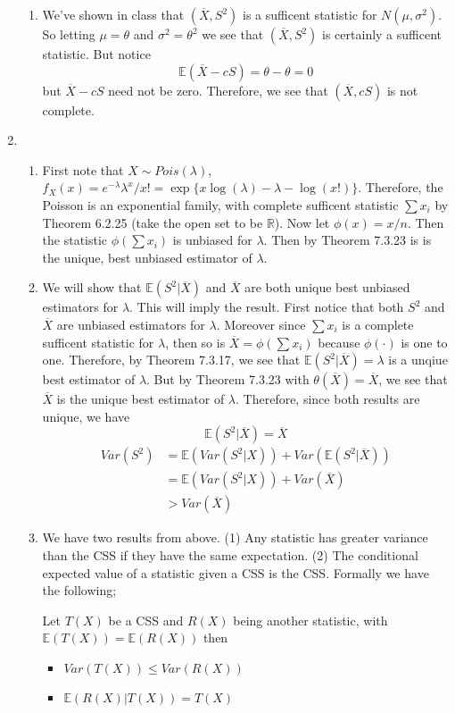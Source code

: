 \documentclass[12pt]{article}  %
\newcommand{\R}{{\mathbb{R}}}
\newcommand{\E}{{\mathbb{E}}}
\begin{document}
\begin{enumerate}
\begin{enumerate}
\item We've shown in class that $(\overline{X}, S^2)$ is a sufficent statistic for $N(\mu, \sigma^2)$. So letting $\mu = \theta$ and $\sigma^2 = \theta^2$ we see that $(\overline{X}, S^2)$ is certainly a sufficent statistic. But notice $$\E(\overline{X} - cS) = \theta - \theta = 0$$ but $\overline{X}-cS$ need not be zero. Therefore, we see that $(\overline{X}, cS)$ is not complete.
\end{enumerate}

\item 
\begin{enumerate}
\item First note that $X\sim Pois(\lambda)$, $f_X(x) = e^{-\lambda}\lambda^x/x! = \exp\{x\log(\lambda) - \lambda - \log(x!)\}$. Therefore, the Poisson is an exponential family, with complete sufficent statistic $\sum x_i$ by Theorem 6.2.25 (take the open set to be $\R$). Now let $\phi(x) = x/n$. Then the statistic $\phi(\sum x_i)$ is unbiased for $\lambda$. Then by Theorem 7.3.23 is is the unique, best unbiased estimator of $\lambda$.  

\item We will show that $\E(S^2|\overline{X})$ and $\overline{X}$ are both unique best unbiased estimators for $\lambda$. This will imply the result. First notice that both $S^2$ and $\overline{X}$ are unbiased estimators for $\lambda$. Moreover since $\sum x_i$ is a complete sufficent statistic for $\lambda$, then so is $\overline{X} = \phi(\sum x_i)$ because $\phi(\cdot)$ is one to one. Therefore, by Theorem 7.3.17, we see that $\E(S^2|\overline{X}) = \lambda$ is a unqiue best estimator of $\lambda$. But by Theorem 7.3.23 with $\theta(\overline{X}) = \overline{X}$, we see that $\overline{X}$ is the unique best estimator of $\lambda$. Therefore, since both results are unique, we have $$\E(S^2|\overline{X}) = \overline{X}$$
\begin{align*}
Var(S^2) &= \E(Var(S^2|X)) + Var(\E(S^2|\overline{X}))\\
&= \E(Var(S^2|X)) + Var(\overline{X})\\
&>Var(\overline{X})
\end{align*}

\item We have two results from above. (1) Any statistic has greater variance than the CSS if they have the same expectation. (2) The conditional expected value of a statistic given a CSS is the CSS. Formally we have the following; 

Let $T(X)$ be a CSS and $R(X)$ being another statistic, with $\E(T(X)) = \E(R(X))$ then \begin{itemize}\item $Var(T(X))\leq Var(R(X))$ \item $\E(R(X)|T(X)) = T(X)$\end{itemize}
\end{enumerate}


\end{enumerate}
\end{document}
